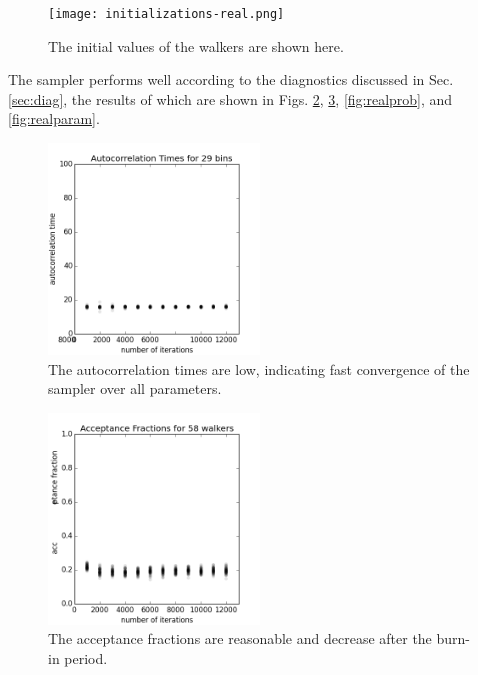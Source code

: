 \documentclass[preprint]{aastex}
\begin{document}
\begin{figure}
\texttt{[image: initializations-real.png]}
\caption{The initial values of the walkers are shown here.}
\label{fig:realival}
\end{figure}

The sampler performs well according to the diagnostics discussed in Sec. \ref{sec:diag}, the results of which are shown in Figs. \ref{fig:realacor}, \ref{fig:realfrac}, \ref{fig:realprob}, and \ref{fig:realparam}.  

\begin{figure}
\includegraphics[width=0.5\textwidth]{times-real.png}
\caption{The autocorrelation times are low, indicating fast convergence of the sampler over all parameters.}
\label{fig:realacor}
\end{figure}

\begin{figure}
\includegraphics[width=0.5\textwidth]{fracs-real.png}
\caption{The acceptance fractions are reasonable and decrease after the burn-in period.}
\label{fig:realfrac}
\end{figure}
\end{document}
